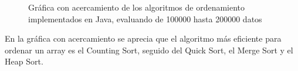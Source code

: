\begin{itemize}
\begin{figure}[H]
	        \caption{Gráfica con acercamiento de los algoritmos de ordenamiento implementados en Java, evaluando de 100000 hasta 200000 datos}
		\end{figure}
En la gráfica con acercamiento se aprecia que el algoritmo más eficiente para ordenar un array es el Counting Sort, seguido del Quick Sort, el Merge Sort y el Heap Sort.
\end{itemize}

